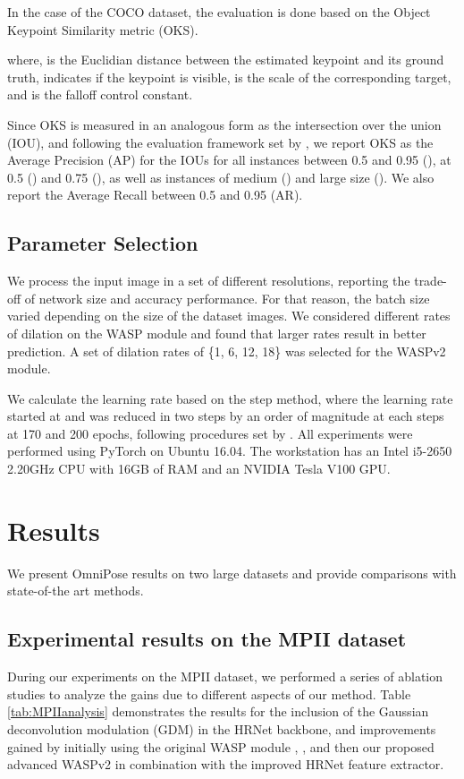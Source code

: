 \documentclass[10pt,twocolumn,letterpaper]{article}
\begin{document}
In the case of the COCO dataset, the evaluation is done based on the Object Keypoint Similarity metric (OKS).



\noindent 
where,  is the Euclidian distance between the estimated keypoint and its ground truth,  indicates if the keypoint is visible,  is the scale of the corresponding target, and  is the falloff control constant.

Since OKS is measured in an analogous form as the intersection over the union (IOU), and following the evaluation framework set by \cite{COCO}, we report OKS as the Average Precision (AP) for the IOUs for all instances between 0.5 and 0.95 (), at 0.5 () and 0.75 (), as well as instances of medium () and large size (). We also report the Average Recall between 0.5 and 0.95 (AR). 

\subsection{Parameter Selection}
We process the input image in a set of different resolutions, reporting the trade-off of network size and accuracy performance.
For that reason, the batch size varied depending on the size of the dataset images.
We considered different rates of dilation on the WASP module and found that larger rates result in better prediction. A set of dilation rates of  \{1, 6, 12, 18\} was selected for the WASPv2 module.

We calculate the learning rate based on the step method, where the learning rate started at  and was reduced in two steps by an order of magnitude at each steps at 170 and 200 epochs, following procedures set by \cite{DarkPose}. 
All experiments were performed using PyTorch on Ubuntu 16.04. The workstation has an Intel i5-2650 2.20GHz CPU with 16GB of RAM and an NVIDIA Tesla V100 GPU.

\section{Results}
We present OmniPose results on two large datasets and provide comparisons with state-of-the art methods.


\subsection{Experimental results on the MPII dataset}
During our experiments on the MPII dataset, we performed a series of ablation studies to analyze the gains due to different aspects of our method. Table \ref{tab:MPIIanalysis} demonstrates the results for the inclusion of the Gaussian deconvolution modulation (GDM) in the HRNet backbone, and improvements gained by initially using the original WASP module \cite{WASP}, \cite{UniPose}, and then our proposed advanced WASPv2 in combination with the improved HRNet feature extractor.
\end{document}
